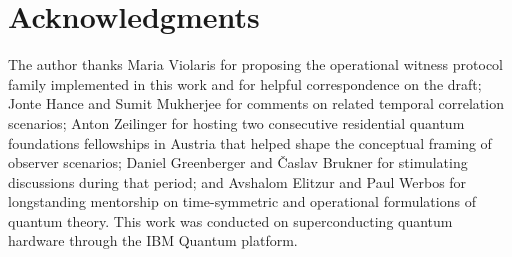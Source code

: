 \documentclass[11pt]{article}
\begin{document}
\section*{Acknowledgments}

The author thanks Maria Violaris for proposing the operational witness protocol family implemented in this work and for helpful correspondence on the draft; Jonte Hance and Sumit Mukherjee for comments on related temporal correlation scenarios; Anton Zeilinger for hosting two consecutive residential quantum foundations fellowships in Austria that helped shape the conceptual framing of observer scenarios; Daniel Greenberger and \v{C}aslav Brukner for stimulating discussions during that period; and Avshalom Elitzur and Paul Werbos for longstanding mentorship on time-symmetric and operational formulations of quantum theory. This work was conducted on superconducting quantum hardware through the IBM Quantum platform.




\end{document}
